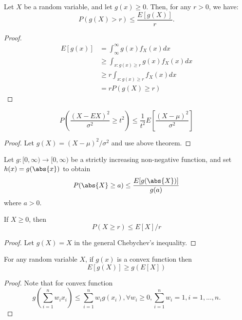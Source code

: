 \begin{refsection}
\begin{theorem}
Let $X$ be a random variable, and let $g(x) \geq 0$. Then, for any $r > 0$, we have:
$$P(g(X)>r) \leq \frac{E[g(X)]}{r}.$$
\end{theorem}
\begin{proof}
\begin{align*}
    E[g(x)] &= \int_{\infty}^{\infty} g(x)f_{X}(x) dx\\
        &\geq \int_{x:g(x)\geq r} g(x)f_{X}(x) dx\\
        & \geq r\int_{x:g(x)\geq  r} f_{X}(x) dx\\
        & = rP(g(X) \geq r)
\end{align*} 
\end{proof}



\begin{corollary}
$$P(\frac{(X-EX)^2}{\sigma^2} \geq t^2) \leq \frac{1}{t^2}E[\frac{(X-\mu)^2}{\sigma^2}]$$
\end{corollary}
\begin{proof}
Let $g(X) = (X-\mu)^2/\sigma^2$ and use above theorem. 
\end{proof}

\begin{corollary}
Let $g:[0,\infty)\to [0,\infty)$ be a strictly increasing non-negative function, and set $h(x) = g(\abs{x})$ to obtain
$$P(\abs{X}\geq a) \leq \frac{E[g(\abs{X})]}{g(a)}$$
where $a > 0$.
\end{corollary}

\begin{corollary}\label{ch:theory-of-probability:th:Markovinequality} 
 If $X\geq 0$, then $$P(X\geq r) \leq E[X]/r$$
\end{corollary}
\begin{proof}
Let $g(X) = X$ in the general Chebychev's inequality.
\end{proof}

\begin{lemma}\label{ch:theory-of-probability:th:Jenseninequality}
For any random variable $X$, if $g(x)$ is a convex function then
$$E[g(X)] \geq g(E[X])$$
\end{lemma}
\begin{proof}
Note that for convex function $$g(\sum_{i=1}^n w_i x_i) \leq \sum_{i=1}^n w_i g(x_i), \forall w_i \geq 0, \sum_{i=1}^n w_i = 1, i=1,...,n.$$
\end{proof}


\end{refsection}
